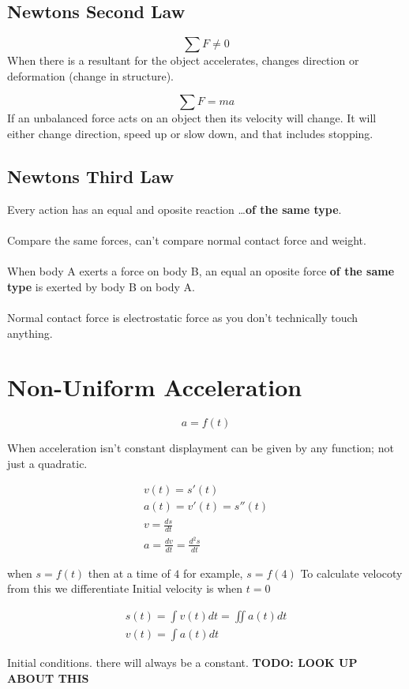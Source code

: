 \documentclass{article}
\begin{document}
\subsection{Newtons Second Law}
\begin{equation}
	\sum F \ne 0
\end{equation}
When there is a resultant for the object accelerates, changes direction or deformation (change in structure).

\begin{equation}
	\sum F = ma
\end{equation}
If an unbalanced force acts on an object then its velocity will change.
It will either change direction, speed up or slow down, and that includes stopping.

\subsection{Newtons Third Law}
Every action has an equal and oposite reaction \ldots \textbf{of the same type}.
\\\\
Compare the same forces, can't compare normal contact force and weight.
\\\\
When body A exerts a force on body B, an equal an oposite force \textbf{of the same type} is exerted by
body B on body A.
\\\\
Normal contact force is electrostatic force as you don't technically touch anything.


\section{Non-Uniform Acceleration}

\begin{equation}
	a = f(t)
\end{equation}


When acceleration isn't constant displayment can be given by any function; not just a quadratic.

\begin{gather}
	v(t) = s'(t) \\
	a(t) = v'(t) = s''(t) \\
	v = \frac{ds}{dt} \\
	a = \frac{dv}{dt} = \frac{d^2s}{dt}
\end{gather}


when  $s = f(t)$ then at a time of $4$ for example, $s = f(4)$
To calculate velocoty from this we differentiate
Initial velocity is when $t = 0$


\begin{gather}
	s(t) = \int v(t) dt = \iint a(t) dt \\
	v(t) = \int a(t) dt
\end{gather}

Initial conditions. there will always be a constant. \textbf{TODO: LOOK UP ABOUT THIS}
\end{document}
